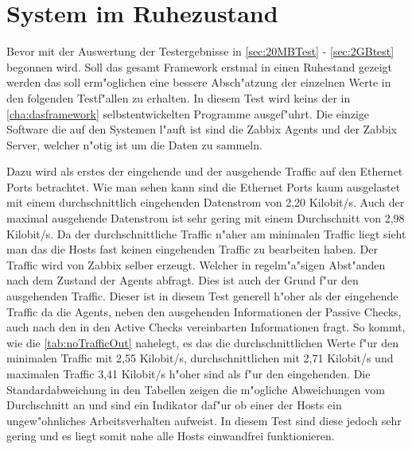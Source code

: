 \section{System im Ruhezustand}
\label{sec:ruhestand}

Bevor mit der Auswertung der Testergebnisse in \cref{sec:20MBTest} - \cref{sec:2GBtest} %
begonnen wird. Soll das gesamt Framework erstmal in einen Ruhestand gezeigt werden %
das soll erm"oglichen eine bessere Absch"atzung der einzelnen Werte in den folgenden Testf"allen %
zu erhalten. In diesem Test wird keins der in \cref{cha:dasframework} selbstentwickelten Programme %
ausgef"uhrt. Die einzige Software die auf den Systemen l"auft ist sind die Zabbix Agents und der Zabbix %
Server, welcher n"otig ist um die Daten zu sammeln. %

Dazu wird als erstes der eingehende und der ausgehende Traffic auf den Ethernet Ports betrachtet. %
Wie man sehen kann sind die Ethernet Ports kaum ausgelastet mit einem durchschnittlich eingehenden %
Datenstrom von 2,20 Kilobit/s. Auch der maximal ausgehende Datenstrom ist sehr gering mit einem %
Durchschnitt von 2,98 Kilobit/s. Da der durchschnittliche Traffic n"aher am minimalen Traffic %
liegt sieht man das die Hosts fast keinen eingehenden Traffic zu bearbeiten haben. Der Traffic %
wird von Zabbix selber erzeugt. Welcher in regelm"a"sigen Abst"anden nach dem Zustand der Agents %
abfragt. Dies ist auch der Grund f"ur den ausgehenden Traffic. Dieser ist in diesem Test %
generell h"oher als der eingehende Traffic da die Agents, neben den ausgehenden Informationen %
der Passive Checks, auch nach den in den Active Checks vereinbarten Informationen fragt. %
So kommt, wie die \cref{tab:noTrafficOut} nahelegt, es das die durchschnittlichen Werte f"ur den %
minimalen Traffic mit 2,55 Kilobit/s, durchschnittlichen mit 2,71 Kilobit/s und maximalen Traffic %
3,41 Kilobit/s h"oher sind als f"ur den eingehenden. Die Standardabweichung in den Tabellen zeigen %
die m"ogliche Abweichungen vom Durchschnitt an und sind ein Indikator daf"ur ob einer der Hosts %
ein ungew"ohnliches Arbeitsverhalten aufweist. In diesem Test sind diese jedoch sehr gering %
und es liegt somit nahe alle Hosts einwandfrei funktionieren.  

